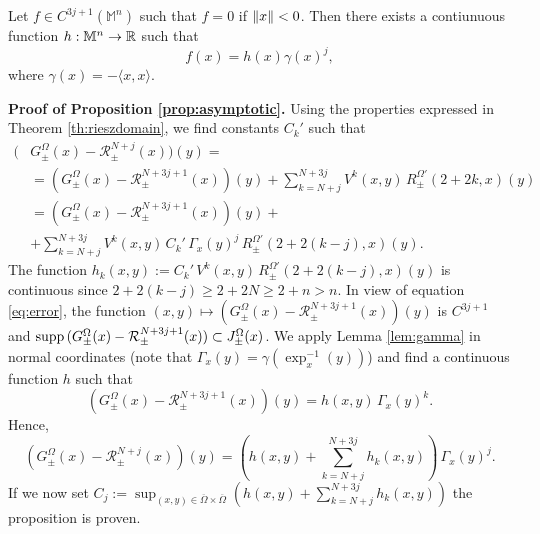 	\begin{lem}
		Let $f\in C^{3j+1}(\mathbb{M}^n)$ such that $f=0$ if $\displaystyle \left \| x \right \|<0$. Then there exists a contiunuous function $h:\mathbb{M}^n\to{\mathbb R}$ such that
		\[		f(x)=h(x)\gamma(x)^j,	\]
		where $\gamma(x)=-\langle x,x\rangle$.
		\label{lem:gamma}
	\end{lem}
\noindent\textbf{Proof of Proposition \ref{prop:asymptotic}.} Using the properties expressed in Theorem \ref{th:rieszdomain}, we find constants $C_k'$ such that
\[	\begin{aligned}
(&G_\pm^\Omega(x)-\mathcal{R}_\pm^{N+j}(x))(y)=\\
&=(G_\pm^\Omega(x)-\mathcal{R}_\pm^{N+3j+1}(x))(y)+\sum_{k=N+j}^{N+3j}V^k(x,y)\,R_\pm^{\Omega'}(2+2k,x)(y)\\
&=(G_\pm^\Omega(x)-\mathcal{R}_\pm^{N+3j+1}(x))(y)+\\
&+\sum_{k=N+j}^{N+3j}V^k(x,y)\,C_k'\,\Gamma_x(y)^j\,R_\pm^{\Omega'}(2+2(k-j),x)(y).
\end{aligned}		\]
The function $h_k(x,y):=C_k'\,V^k(x,y)\,R_\pm^{\Omega'}(2+2(k-j),x)(y)$ is continuous since $2+2(k-j)\geq 2+2N\geq2+n>n$. In view of equation \eqref{eq:error}, the function $(x,y)\mapsto(G_\pm^\Omega(x)-\mathcal{R}_\pm^{N+3j+1}(x))(y)$ is $C^{3j+1}$ and $\text{supp}\,(G_\pm^\Omega(x)-\mathcal{R}_\pm^{N+3j+1}(x))\subset J_\pm^\Omega(x)$. We apply Lemma \ref{lem:gamma} in normal coordinates (note that $\Gamma_x(y)=\gamma(\exp_x^{-1}(y))$) and find a continuous function $h$ such that
\[	(G_\pm^\Omega(x)-\mathcal{R}_\pm^{N+3j+1}(x))(y)=h(x,y)\,\Gamma_x(y)^k.			\]
Hence,
\[	(G_\pm^\Omega(x)-\mathcal{R}_\pm^{N+j}(x))(y)=\left(h(x,y)+\sum_{k=N+j}^{N+3j}h_k(x,y)\right)\,\Gamma_x(y)^j.		\]
If we now set $C_j:=\sup_{(x,y)\in\overline{\Omega}\times\overline{\Omega}}\left(h(x,y)+\sum_{k=N+j}^{N+3j}h_k(x,y)\right)$ the proposition is proven.\endproof\\


